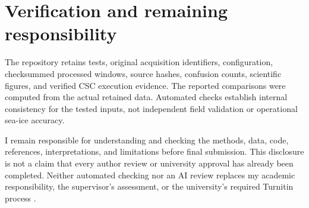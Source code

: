 \section{Verification and remaining responsibility}

The repository retains tests, original acquisition identifiers, configuration,
checksummed processed windows, source hashes, confusion counts, scientific
figures, and verified CSC execution evidence. The reported comparisons were
computed from the actual retained data. Automated checks establish
internal consistency for the tested inputs, not independent field validation
or operational sea-ice accuracy.

I remain responsible for understanding and checking the methods, data,
code, references, interpretations, and limitations before final submission.
This disclosure is not a claim that every author review or university
approval has already been completed. Neither automated checking nor an AI
review replaces my academic responsibility, the supervisor's assessment, or
the university's required Turnitin process \citep{uwasa-writing}.
